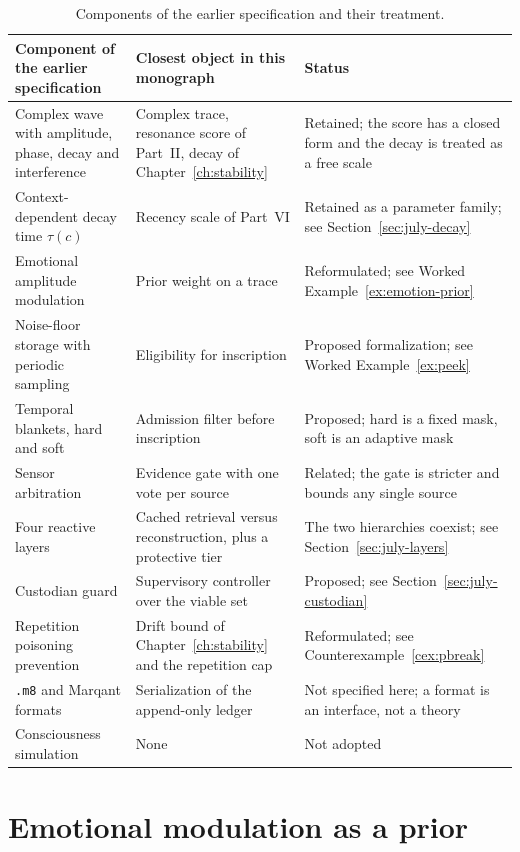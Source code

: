 \begin{table}[ht]
\centering\small
\begin{tabular}{p{3.6cm}p{4.2cm}p{4.6cm}}
\toprule
Component of the earlier specification & Closest object in this monograph & Status \\
\midrule
Complex wave with amplitude, phase, decay and interference & Complex trace, resonance score of Part~II, decay of Chapter~\ref{ch:stability} & Retained; the score has a closed form and the decay is treated as a free scale \\
Context-dependent decay time $\tau(c)$ & Recency scale of Part~VI & Retained as a parameter family; see Section~\ref{sec:july-decay} \\
Emotional amplitude modulation & Prior weight on a trace & Reformulated; see Worked Example~\ref{ex:emotion-prior} \\
Noise-floor storage with periodic sampling & Eligibility for inscription & Proposed formalization; see Worked Example~\ref{ex:peek} \\
Temporal blankets, hard and soft & Admission filter before inscription & Proposed; hard is a fixed mask, soft is an adaptive mask \\
Sensor arbitration & Evidence gate with one vote per source & Related; the gate is stricter and bounds any single source \\
Four reactive layers & Cached retrieval versus reconstruction, plus a protective tier & The two hierarchies coexist; see Section~\ref{sec:july-layers} \\
Custodian guard & Supervisory controller over the viable set & Proposed; see Section~\ref{sec:july-custodian} \\
Repetition poisoning prevention & Drift bound of Chapter~\ref{ch:stability} and the repetition cap & Reformulated; see Counterexample~\ref{cex:pbreak} \\
\texttt{.m8} and Marqant formats & Serialization of the append-only ledger & Not specified here; a format is an interface, not a theory \\
Consciousness simulation & None & Not adopted \\
\bottomrule
\end{tabular}
\caption{Components of the earlier specification and their treatment.}\label{tab:july-map}
\end{table}

\section{Emotional modulation as a prior}\label{sec:july-emotion}

